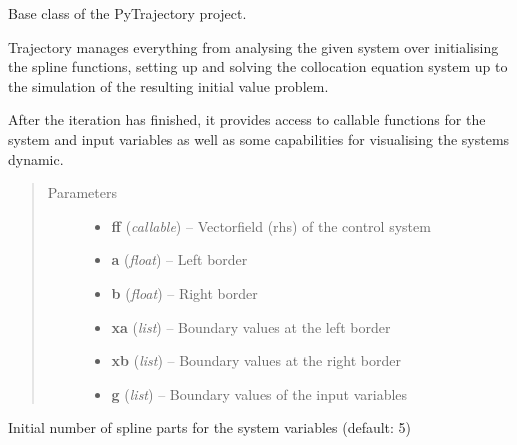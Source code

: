 \documentclass[letterpaper,10pt,english]{sphinxmanual}
\begin{document}
\begin{fulllineitems}
\label{pytrajectory:pytrajectory.trajectory.Trajectory}
Base class of the PyTrajectory project.

Trajectory manages everything from analysing the given system over
initialising the spline functions, setting up and solving the collocation
equation system up to the simulation of the resulting initial value problem.

After the iteration has finished, it provides access to callable functions
for the system and input variables as well as some capabilities for
visualising the systems dynamic.
\begin{quote}\begin{description}
\item[{Parameters}] \leavevmode\begin{itemize}
\item {} 
\textbf{ff} (\emph{callable}) -- Vectorfield (rhs) of the control system

\item {} 
\textbf{a} (\emph{float}) -- Left border

\item {} 
\textbf{b} (\emph{float}) -- Right border

\item {} 
\textbf{xa} (\emph{list}) -- Boundary values at the left border

\item {} 
\textbf{xb} (\emph{list}) -- Boundary values at the right border

\item {} 
\textbf{g} (\emph{list}) -- Boundary values of the input variables

\end{itemize}

\end{description}\end{quote}

\begin{fulllineitems}
\label{pytrajectory:pytrajectory.trajectory.Trajectory.sx}
Initial number of spline parts for the system variables (default: 5)

\end{fulllineitems}


\end{fulllineitems}
\end{document}
